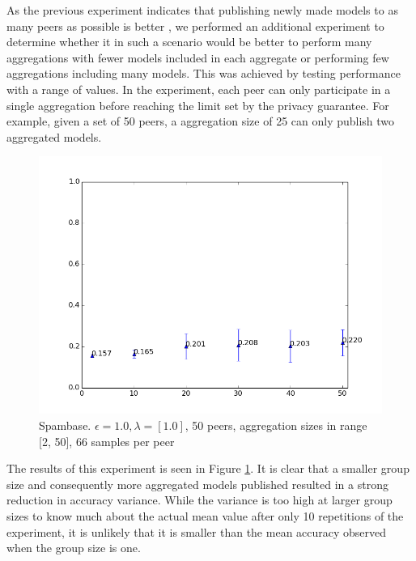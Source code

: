 As the previous experiment indicates that publishing newly made models to as many peers as possible is better , we performed an additional experiment to determine whether it in such a scenario would be better to perform many aggregations with fewer models included in each aggregate or performing few aggregations including many models. This was achieved by testing performance with a range of values. In the experiment, each peer can only participate in a single aggregation before reaching the limit set by the privacy guarantee. For example, given a set of 50 peers, a aggregation size of 25 can only publish two aggregated models.
 
\begin{figure}[h!]
	\centering
	\includegraphics[width=\textwidth]{fig/GroupSizeEffectSpam-eps1.0,budg=eps,peers50,groups2-50,reg2e0-pubAll-LRbyCV-retuning}
	\caption{Spambase. $\epsilon = 1.0, \lambda = [1.0]$, 50 peers, aggregation sizes in range [2, 50], 66 samples per peer}
	\label{fig:groupsize_is_better}
\end{figure}

The results of this experiment is seen in Figure \ref{fig:groupsize_is_better}. It is clear that a smaller group size and consequently more aggregated models published resulted in a strong reduction in accuracy variance. While the variance is too high at larger group sizes to know much about the actual mean value after only 10 repetitions of the experiment, it is unlikely that it is smaller than the mean accuracy observed when the group size is one. 


